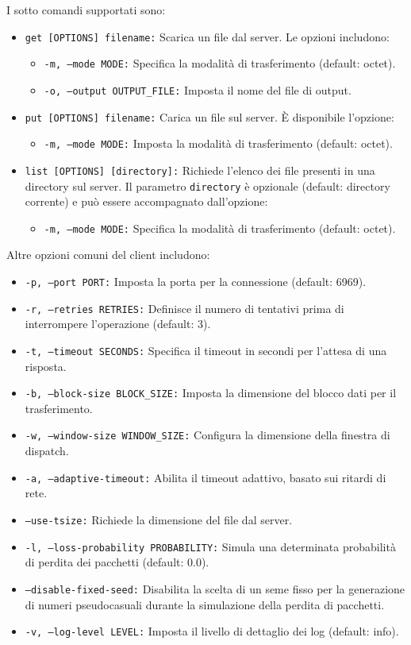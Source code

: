 \documentclass[12pt]{article}
\begin{document}
{I sotto comandi supportati sono:
\begin{itemize}
    \item \texttt{get [OPTIONS] filename:} Scarica un file dal server. Le opzioni includono:
    \begin{itemize}
        \item \texttt{-m, --mode MODE:} Specifica la modalità di trasferimento (default: octet).
        \item \texttt{-o, --output OUTPUT\_FILE:} Imposta il nome del file di output.
    \end{itemize}
    \item \texttt{put [OPTIONS] filename:} Carica un file sul server. È disponibile l'opzione:
    \begin{itemize}
        \item \texttt{-m, --mode MODE:} Imposta la modalità di trasferimento (default: octet).
    \end{itemize}
    \item \texttt{list [OPTIONS] [directory]:} Richiede l'elenco dei file presenti in una directory sul server. Il parametro \texttt{directory} è opzionale (default: directory corrente) e può essere accompagnato dall'opzione:
    \begin{itemize}
        \item \texttt{-m, --mode MODE:} Specifica la modalità di trasferimento (default: octet).
    \end{itemize}
\end{itemize}

Altre opzioni comuni del client includono:
\begin{itemize}
    \item \texttt{-p, --port PORT:} Imposta la porta per la connessione (default: 6969).
    \item \texttt{-r, --retries RETRIES:} Definisce il numero di tentativi prima di interrompere l'operazione (default: 3).
    \item \texttt{-t, --timeout SECONDS:} Specifica il timeout in secondi per l'attesa di una risposta.
    \item \texttt{-b, --block-size BLOCK\_SIZE:} Imposta la dimensione del blocco dati per il trasferimento.
    \item \texttt{-w, --window-size WINDOW\_SIZE:} Configura la dimensione della finestra di dispatch.
    \item \texttt{-a, --adaptive-timeout:} Abilita il timeout adattivo, basato sui ritardi di rete.
    \item \texttt{--use-tsize:} Richiede la dimensione del file dal server.
    \item \texttt{-l, --loss-probability PROBABILITY:} Simula una determinata probabilità di perdita dei pacchetti (default: 0.0).
    \item \texttt{--disable-fixed-seed:} Disabilita la scelta di un seme fisso per la generazione di numeri pseudocasuali durante la simulazione della perdita di pacchetti.
    \item \texttt{-v, --log-level LEVEL:} Imposta il livello di dettaglio dei log (default: info).
\end{itemize}

}
\end{document}
